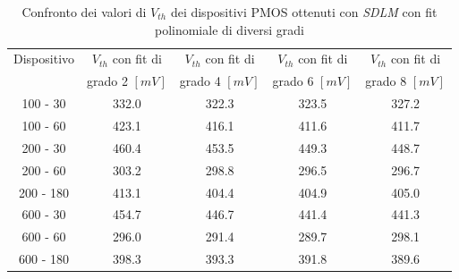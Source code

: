 \documentclass[12pt, letterpaper]{book}
\begin{document}
\begin{table}[htp]
  \renewcommand{\arraystretch}{1.3}
  \caption{Confronto dei valori di $V_{th}$ dei dispositivi PMOS ottenuti con \emph{SDLM} con fit polinomiale di diversi gradi}
  \label{tab:GradiSDLM}
  \begin{center}
    \begin{tabular}{c c c c c}
      \hline
      Dispositivo & $V_{th}$  con fit di & $V_{th}$  con fit di & $V_{th}$  con fit di & $V_{th}$  con fit di \\
                  & grado 2 $[mV]$       & grado 4 $[mV]$       & grado 6 $[mV]$       & grado 8 $[mV]$       \\
      \hline
      100 - 30    & 332.0                & 322.3                & 323.5                & 327.2                \\
      \hline
      100 - 60    & 423.1                & 416.1                & 411.6                & 411.7                \\
      \hline
      200 - 30    & 460.4                & 453.5                & 449.3                & 448.7                \\
      \hline
      200 - 60    & 303.2                & 298.8                & 296.5                & 296.7                \\
      \hline
      200 - 180   & 413.1                & 404.4                & 404.9                & 405.0                \\
      \hline
      600 - 30    & 454.7                & 446.7                & 441.4                & 441.3                \\
      \hline
      600 - 60    & 296.0                & 291.4                & 289.7                & 298.1                \\
      \hline
      600 - 180   & 398.3                & 393.3                & 391.8                & 389.6                \\
      \hline
    \end{tabular}
  \end{center}
\end{table}
\end{document}
